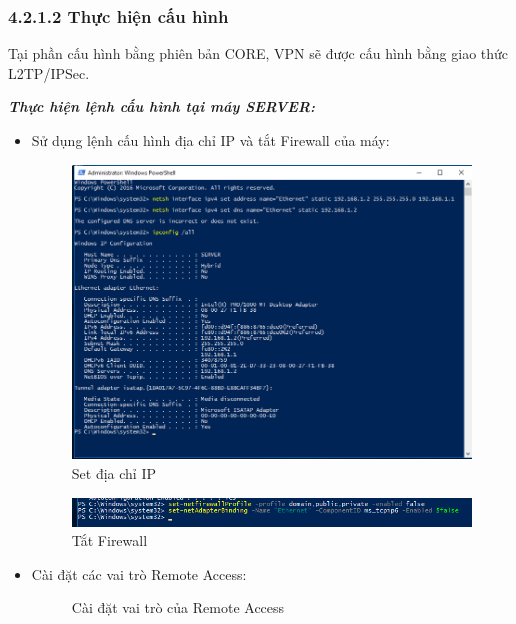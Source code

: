  \subsubsection*{4.2.1.2 Thực hiện cấu hình}
 Tại phần cấu hình bằng phiên bản CORE, VPN sẽ được cấu hình bằng giao thức L2TP/IPSec.
 
\textbf{\textit{Thực hiện lệnh cấu hình tại máy SERVER:}}
\begin{itemize}
    \item Sử dụng lệnh cấu hình địa chỉ IP và tắt Firewall của máy:

    \begin{figure}[htbp]
        \centering
        \includegraphics[width=0.5\linewidth]{coreRemoteAccess/setIPv4.png}
        \caption{Set địa chỉ IP}
    \end{figure}
    \begin{figure}[htbp]
        \centering
        \includegraphics[width=0.5\linewidth]{coreRemoteAccess/TatTuongLuaServer.png}
        \caption{Tắt Firewall}
    \end{figure}

    \item Cài đặt các vai trò Remote Access:
    \begin{figure}[htbp]
            \hfill
            \hfill
            \caption{Cài đặt vai trò của Remote Access}
        \end{figure}


\end{itemize}
